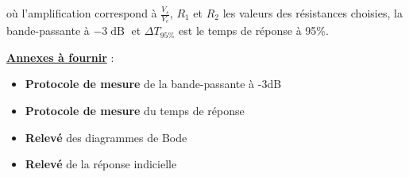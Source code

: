 où l'amplification correspond à $\frac{V_s}{V_e}$, $R_1$ et $R_2$ les valeurs des résistances choisies, la bande-passante à $-3\operatorname{dB}$ et $\Delta{}T_{95\%}$ est le temps de réponse à 95\%.
 
\medskip

\noindent
\underline{\textbf{Annexes à fournir}} : 

\begin{itemize}[label=$\square$]
	\item \textbf{Protocole de mesure} de la bande-passante à -3dB
	\item \textbf{Protocole de mesure} du temps de réponse
	\item \textbf{Relevé} des diagrammes de Bode 
	\item \textbf{Relevé} de la réponse indicielle
\end{itemize}
 
\medskip

\noindent
\begin{minipage}{0.23\linewidth}
\end{minipage}
\hfill
\begin{minipage}{0.23\linewidth}
\end{minipage}
\hfill
\begin{minipage}{0.23\linewidth}
\end{minipage}
\hfill
\begin{minipage}{0.23\linewidth}
\end{minipage}





